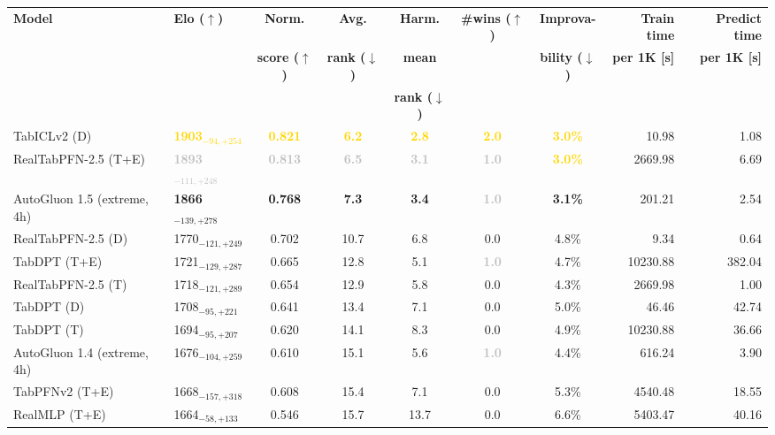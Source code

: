 \begin{tabular}{llcccccrr}
\toprule
\textbf{Model} & \textbf{Elo ($\uparrow$)} & \textbf{Norm.} & \textbf{Avg.} & \textbf{Harm.} & \textbf{\#wins ($\uparrow$)} & \textbf{Improva-} & \textbf{Train time} & \textbf{Predict time} \\
 &  & \textbf{score ($\uparrow$)} & \textbf{rank ($\downarrow$)} & \textbf{mean} &  & \textbf{bility ($\downarrow$)} & \textbf{per 1K [s]} & \textbf{per 1K [s]} \\
 &  &  &  & \textbf{rank ($\downarrow$)} &  &  &  &  \\
\midrule
TabICLv2 (D) & \textcolor{gold}{\textbf{1903${}_{-94,+254}$}} & \textcolor{gold}{\textbf{0.821}} & \textcolor{gold}{\textbf{6.2}} & \textcolor{gold}{\textbf{2.8}} & \textcolor{gold}{\textbf{2.0}} & \textcolor{gold}{\textbf{3.0\%}} & 10.98 & 1.08 \\
RealTabPFN-2.5 (T+E) & \textcolor{silver}{\textbf{1893${}_{-111,+248}$}} & \textcolor{silver}{\textbf{0.813}} & \textcolor{silver}{\textbf{6.5}} & \textcolor{silver}{\textbf{3.1}} & \textcolor{silver}{\textbf{1.0}} & \textcolor{gold}{\textbf{3.0\%}} & 2669.98 & 6.69 \\
AutoGluon 1.5 (extreme, 4h) & \textcolor{bronze}{\textbf{1866${}_{-139,+278}$}} & \textcolor{bronze}{\textbf{0.768}} & \textcolor{bronze}{\textbf{7.3}} & \textcolor{bronze}{\textbf{3.4}} & \textcolor{silver}{\textbf{1.0}} & \textcolor{bronze}{\textbf{3.1\%}} & 201.21 & 2.54 \\
RealTabPFN-2.5 (D) & 1770${}_{-121,+249}$ & 0.702 & 10.7 & 6.8 & 0.0 & 4.8\% & 9.34 & 0.64 \\
TabDPT (T+E) & 1721${}_{-129,+287}$ & 0.665 & 12.8 & 5.1 & \textcolor{silver}{\textbf{1.0}} & 4.7\% & 10230.88 & 382.04 \\
RealTabPFN-2.5 (T) & 1718${}_{-121,+289}$ & 0.654 & 12.9 & 5.8 & 0.0 & 4.3\% & 2669.98 & 1.00 \\
TabDPT (D) & 1708${}_{-95,+221}$ & 0.641 & 13.4 & 7.1 & 0.0 & 5.0\% & 46.46 & 42.74 \\
TabDPT (T) & 1694${}_{-95,+207}$ & 0.620 & 14.1 & 8.3 & 0.0 & 4.9\% & 10230.88 & 36.66 \\
AutoGluon 1.4 (extreme, 4h) & 1676${}_{-104,+259}$ & 0.610 & 15.1 & 5.6 & \textcolor{silver}{\textbf{1.0}} & 4.4\% & 616.24 & 3.90 \\
TabPFNv2 (T+E) & 1668${}_{-157,+318}$ & 0.608 & 15.4 & 7.1 & 0.0 & 5.3\% & 4540.48 & 18.55 \\
RealMLP (T+E) & 1664${}_{-58,+133}$ & 0.546 & 15.7 & 13.7 & 0.0 & 6.6\% & 5403.47 & 40.16 \\

\end{tabular}
